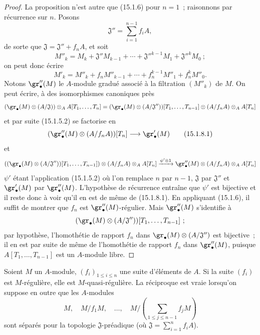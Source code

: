 \begin{proof}
La proposition n'est autre que (15.1.6) pour $n=1$~; raisonnons par récurrence
sur $n$. Posons
\[
  \mathfrak{J}''=\sum_{i=1}^{n-1}f_iA,
\]
de sorte que $\mathfrak{J}=\mathfrak{J}''+f_nA$, et soit
\[
  M''_k=M_k+\mathfrak{J}''M_{k-1}+\cdots+
  \mathfrak{J}''^{k-1}M_1+\mathfrak{J}''^kM_0~;
\]
on peut donc écrire
\[
  M'_k=M''_k+f_nM''_{k-1}+\cdots+f_n^{k-1}M''_1+f_n^kM''_0.
\]
Notons $\gr''_\bullet(M)$ le $A$-module gradué associé à la filtration
$(M''_k)$ de $M$. On peut écrire, à des isomorphismes canoniques près
\[
  (\gr_\bullet(M)\otimes(A/\mathfrak{J}))\otimes_A A[T_1,\ldots,T_n]
  =
  (\gr_\bullet(M)\otimes(A/\mathfrak{J}''))[T_1,\ldots,T_{n-1}]
  \otimes(A/f_nA)\otimes_A A[T_n]
\]
et par suite (15.1.5.2) se factorise en
\[
  (\gr''_\bullet(M)\otimes(A/f_nA))[T_n]\longrightarrow\gr'_\bullet(M)
  \tag{15.1.8.1}\label{0.15.1.8.1-fr}
\]
et
\[
  ((\gr_\bullet(M)\otimes(A/\mathfrak{J}''))[T_1,\ldots,T_{n-1}])
  \otimes(A/f_nA)\otimes_A A[T_n]
  \xrightarrow{\psi'\otimes1}
  \gr''_\bullet(M)\otimes(A/f_nA)\otimes_A A[T_n]
\]
$\psi'$ étant l'application (15.1.5.2) où l'on remplace $n$ par $n-1$,
$\mathfrak{J}$ par $\mathfrak{J}''$ et $\gr'_\bullet(M)$ par
$\gr''_\bullet(M)$. L'hypothèse de récurrence entraîne que $\psi'$ est
bijective et il reste donc à voir qu'il en est de même de (15.1.8.1). En
appliquant (15.1.6), il suffit de montrer que $f_n$ est
$\gr''_\bullet(M)$-régulier. Mais $\gr''_\bullet(M)$ s'identifie à
\[
  (\gr_\bullet(M)\otimes(A/\mathfrak{J}''))
  [T_1,\ldots,T_{n-1}]~;
\]
par hypothèse, l'homothétie de rapport $f_n$ dans
$\gr_\bullet(M)\otimes(A/\mathfrak{J}'')$ est bijective~; il en est par suite
de même de l'homothétie de rapport $f_n$ dans $\gr''_\bullet(M)$, puisque
$A[T_1,\ldots,T_{n-1}]$ est un $A$-module libre.
\end{proof}

\begin{proposition}[15.1.9]
\label{0.15.1.9-fr}
Soient $M$ un $A$-module, $(f_i)_{1\leq i\leq n}$ une suite d'éléments de $A$.
Si la suite $(f_i)$ est $M$-régulière, elle est $M$-quasi-régulière. La
réciproque est vraie lorsqu'on suppose en outre que les $A$-modules
\[
  M,\quad M/f_1M,\quad\ldots,\quad
  M/\left(\sum_{1\leq j\leq n-1}f_jM\right)
\]
sont séparés pour la topologie $\mathfrak{J}$-préadique (où
$\mathfrak{J}=\sum_{i=1}^n f_iA$).
\end{proposition}


